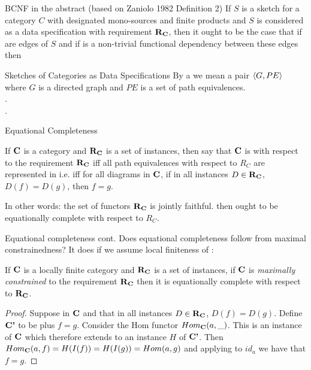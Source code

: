 \begin{frame}{BCNF in the abstract (based on Zaniolo 1982 Definition 2)}
If $S$ is a sketch for a category $C$ with designated mono-sources  and finite products
and $S$ is considered as a data specification with requirement $\textbf{R}_{\textbf{C}}$, then it ought to be the case
that if 
are edges of $S$
and if   is a non-trivial functional dependency  between these edges
then 
\end{frame}


\begin{frame}{Sketches of Categories as Data Specifications}
By a  we mean a pair $\langle G,PE\rangle$ where 
$G$ is a directed graph and $PE$ is a set of path equivalences. \\
\medskip
\goodnessoneA. \\
\medskip
\goodnessoneB.
\end{frame}

\begin{frame}{Equational Completeness}
\begin{definition}
If $\textbf{C}$ is a  category and $\textbf{R}_{\textbf{C}}$ is a set of instances,
 then say that  $\textbf{C}$ is  with respect 
to the requirement $\textbf{R}_{\textbf{C}}$ iff all path equivalences with respect to $R_C$ are represented in \catcw 
i.e. iff for all diagrams \fgparalleldiagram in $\textbf{C}$,  
if in all instances $D \in \textbf{R}_{\textbf{C}}$, $D(f)=D(g)$,  then $f=g$.
\end{definition}

In other words:
the set of functors $\textbf{R}_{\textbf{C}}$ is jointly faithful.
\medskip
{} \IfSforCwithRCwords then \catcw ought to be equationally complete
with respect to $R_C$.
\end{frame}

\begin{frame}{Equational completeness cont. }
Does equational completeness follow from maximal constrainedness?
It does if we assume local finiteness of \catc:
\begin{lemma}
If $\textbf{C}$ is a locally finite category and $\textbf{R}_{\textbf{C}}$ is a set of instances, if $\textbf{C}$ 
 is
\textit{maximally constrained} to the requirement $\textbf{R}_{\textbf{C}}$ then it is equationally
complete with respect to $\textbf{R}_{\textbf{C}}$.
\end{lemma}
\begin{proof}
Suppose \fgparalleldiagram  in $\textbf{C}$ and that in all instances $D \in \textbf{R}_{\textbf{C}}$, $D(f)=D(g)$. 
Define $\textbf{C'}$ to be \catc plus $f=g$. Consider the Hom functor $Hom_{\textbf{C}}(a,\_)$. 
This is an instance of $\textbf{C}$ which therefore extends to an instance $H$ of $\textbf{C'}$.  Then
$Hom_{\textbf{C}}(a,f)=H(I(f))=H(I(g))=Hom(a,g)$ and applying to $id_a$ we have that $f=g$.
\end{proof}
\end{frame}

